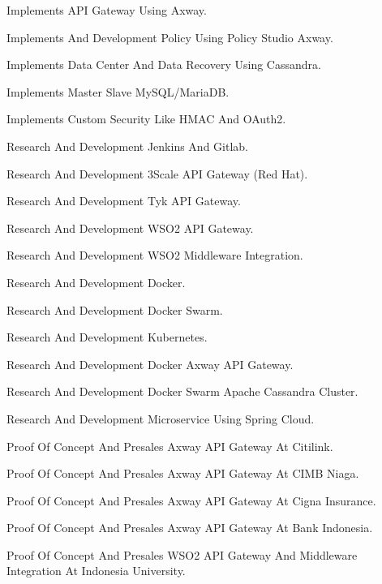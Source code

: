 \documentclass[english]{cv-style}
\begin{document}
\begin{entrylist}
{\begin{itemize}
{    \item Implements API Gateway Using Axway.
    \item Implements And Development Policy Using Policy Studio Axway.
    \item Implements Data Center And Data Recovery Using Cassandra.
    \item Implements Master Slave MySQL/MariaDB.
    \item Implements Custom Security Like HMAC And OAuth2.
    \item Research And Development Jenkins And Gitlab.
    \item Research And Development 3Scale API Gateway (Red Hat).
    \item Research And Development Tyk API Gateway.
    \item Research And Development WSO2 API Gateway.
    \item Research And Development WSO2 Middleware Integration.
    \item Research And Development Docker.
    \item Research And Development Docker Swarm.
    \item Research And Development Kubernetes.
    \item Research And Development Docker Axway API Gateway.
    \item Research And Development Docker Swarm Apache Cassandra Cluster.
    \item Research And Development Microservice Using Spring Cloud.
    \item Proof Of Concept And Presales Axway API Gateway At Citilink.
    \item Proof Of Concept And Presales Axway API Gateway At CIMB Niaga.
    \item Proof Of Concept And Presales Axway API Gateway At Cigna Insurance.
    \item Proof Of Concept And Presales Axway API Gateway At Bank Indonesia.
    \item Proof Of Concept And Presales WSO2 API Gateway And Middleware Integration At Indonesia University.}
  \end{itemize}}
\end{entrylist}
\end{document}
